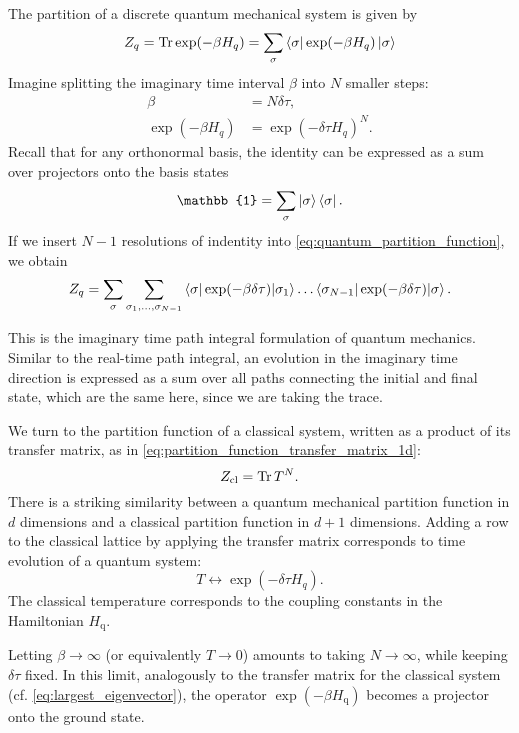 The partition of a discrete quantum mechanical system is given by
\begin{equation}\label{eq:quantum_partition_function}
  Z_{q} = \operatorname{Tr} \exp(-\beta H_{q}) =
  \sum_{\sigma} \bra{\sigma} \exp(-\beta H_{q}) \ket{\sigma}
\end{equation}
Imagine splitting the imaginary time interval $\beta$ into $N$ smaller steps:
\begin{align}
  \beta &= N \delta \tau, \\
  \exp(-\beta H_q) &= \exp(-\delta \tau H_q)^N.
\end{align}
Recall that for any orthonormal basis, the identity can be expressed as a sum over
projectors onto the basis states
\begin{equation}
    \mathbb{1} = \sum_{\sigma} \ket{\sigma}\bra{\sigma}.
\end{equation}
If we insert $N - 1$ resolutions of indentity into
\autoref{eq:quantum_partition_function}, we obtain
\begin{equation}
  Z_q = \sum_{\sigma} \sum_{\sigma_1, \dots, \sigma_{N-1}}
  \braket{\sigma | \exp(-\beta \delta \tau) | \sigma_1} \dots
  \braket{\sigma_{N-1} | \exp(-\beta \delta \tau) | \sigma}.
\end{equation}

This is the imaginary time path integral formulation of quantum mechanics. Similar to the
real-time path integral, an evolution in the imaginary time direction is expressed as a
sum over all paths connecting the initial and final state, which are the same here, since
we are taking the trace.

We turn to the partition function of a classical system, written as a product of
its transfer matrix, as in \autoref{eq:partition_function_transfer_matrix_1d}:
\begin{equation}
  Z_{\text{cl}} = \operatorname{Tr} T^N.
\end{equation}
There is a striking similarity between a quantum mechanical partition function in $d$
dimensions and a classical partition function in $d + 1$ dimensions.
Adding a row to the classical lattice by applying the transfer matrix corresponds to time
evolution of a quantum system:
\begin{equation}
  T \longleftrightarrow \exp(-\delta \tau H_q).
\end{equation}
The classical temperature corresponds to the coupling constants in the Hamiltonian
$H_{\text{q}}$.

Letting $\beta \to \infty$ (or equivalently $T \to 0$) amounts to taking $N \to \infty$,
while keeping $\delta \tau$ fixed. In this limit, analogously to the transfer matrix for
the classical system (cf. \autoref{eq:largest_eigenvector}), the operator $\exp(-\beta
H_{\text{q}})$ becomes a projector onto the ground state.

